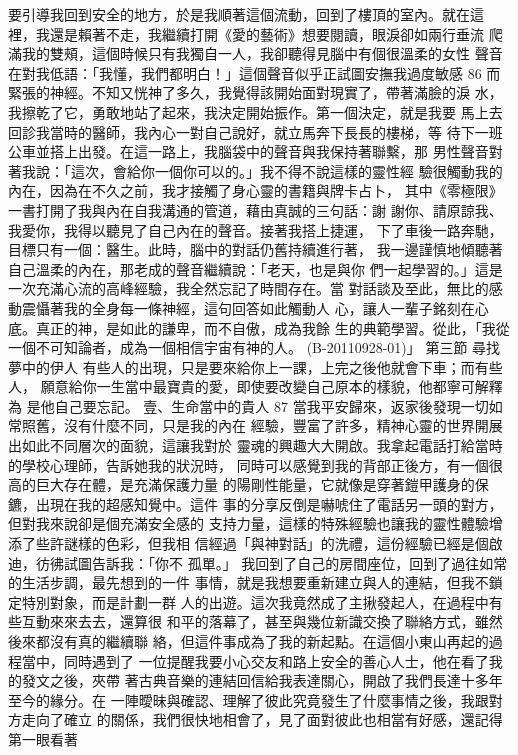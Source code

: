 要引導我回到安全的地方，於是我順著這個流動，回到了樓頂的室內。就在這
裡，我還是賴著不走，我繼續打開《愛的藝術》想要閱讀，眼淚卻如兩行垂流
爬滿我的雙頰，這個時候只有我獨自一人，我卻聽得見腦中有個很溫柔的女性
聲音在對我低語：「我懂，我們都明白！」這個聲音似乎正試圖安撫我過度敏感
86 
而緊張的神經。不知又恍神了多久，我覺得該開始面對現實了，帶著滿臉的淚
水，我擦乾了它，勇敢地站了起來，我決定開始振作。第一個決定，就是我要
馬上去回診我當時的醫師，我內心一對自己說好，就立馬奔下長長的樓梯，等
待下一班公車並搭上出發。在這一路上，我腦袋中的聲音與我保持著聯繫，那
男性聲音對著我說：「這次，會給你一個你可以的。」我不得不說這樣的靈性經
驗很觸動我的內在，因為在不久之前，我才接觸了身心靈的書籍與牌卡占卜，
其中《零極限》一書打開了我與內在自我溝通的管道，藉由真誠的三句話：謝
謝你、請原諒我、我愛你，我得以聽見了自己內在的聲音。接著我搭上捷運，
下了車後一路奔馳，目標只有一個：醫生。此時，腦中的對話仍舊持續進行著，
我一邊謹慎地傾聽著自己溫柔的內在，那老成的聲音繼續說：「老天，也是與你
們一起學習的。」這是一次充滿心流的高峰經驗，我全然忘記了時間存在。當
對話談及至此，無比的感動震懾著我的全身每一條神經，這句回答如此觸動人
心，讓人一輩子銘刻在心底。真正的神，是如此的謙卑，而不自傲，成為我餘
生的典範學習。從此，「我從一個不可知論者，成為一個相信宇宙有神的人。 
(B-20110928-01)」 
第三節 尋找夢中的伊人 
有些人的出現，只是要來給你上一課，上完之後他就會下車；而有些人，
願意給你一生當中最寶貴的愛，即使要改變自己原本的樣貌，他都寧可解釋為
是他自己要忘記。 
壹、生命當中的貴人 
87 
當我平安歸來，返家後發現一切如常照舊，沒有什麼不同，只是我的內在
經驗，豐富了許多，精神心靈的世界開展出如此不同層次的面貌，這讓我對於
靈魂的興趣大大開啟。我拿起電話打給當時的學校心理師，告訴她我的狀況時，
同時可以感覺到我的背部正後方，有一個很高的巨大存在體，是充滿保護力量
的陽剛性能量，它就像是穿著鎧甲護身的保鑣，出現在我的超感知覺中。這件
事的分享反倒是嚇唬住了電話另一頭的對方，但對我來說卻是個充滿安全感的
支持力量，這樣的特殊經驗也讓我的靈性體驗增添了些許謎樣的色彩，但我相
信經過「與神對話」的洗禮，這份經驗已經是個啟迪，彷彿試圖告訴我：「你不
孤單。」 
我回到了自己的房間座位，回到了過往如常的生活步調，最先想到的一件
事情，就是我想要重新建立與人的連結，但我不鎖定特別對象，而是計劃一群
人的出遊。這次我竟然成了主揪發起人，在過程中有些互動來來去去，還算很
和平的落幕了，甚至與幾位新識交換了聯絡方式，雖然後來都沒有真的繼續聯
絡，但這件事成為了我的新起點。在這個小東山再起的過程當中，同時遇到了
一位提醒我要小心交友和路上安全的善心人士，他在看了我的發文之後，夾帶
著古典音樂的連結回信給我表達關心，開啟了我們長達十多年至今的緣分。在
一陣曖昧與確認、理解了彼此究竟發生了什麼事情之後，我跟對方走向了確立
的關係，我們很快地相會了，見了面對彼此也相當有好感，還記得第一眼看著
